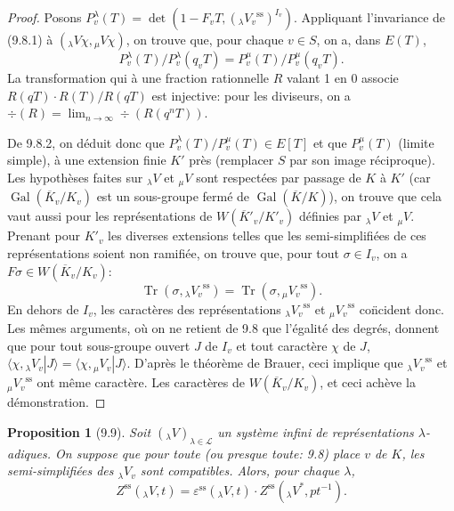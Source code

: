 \documentclass[11pt]{amsart}
\theoremstyle{plain}
\newtheorem{proposition}[theorem]{Proposition}
\theoremstyle{definition}
\DeclareMathOperator{\Gal}{Gal}
\DeclareMathOperator{\Tr}{Tr}
\begin{document}
\begin{proof}
Posons $P_v^\lambda(T) = \det(1 - F_v T, ({_\lambda V_v}^{\mathrm{ss}})^{I_v})$. Appliquant l'invariance de (9.8.1) \`a $(_\lambda V \chi, {_\mu V} \chi)$, on trouve que, pour chaque $v \in S$, on a, dans $E(T)$,
\begin{equation}
P_v^\lambda(T) / P_v^\lambda(q_v T) = P_v^\mu(T) / P_v^\mu(q_v T).
\tag{9.8.2}
\end{equation}
La transformation qui \`a une fraction rationnelle $R$ valant 1 en 0 associe $R(qT) \cdot R(T)/R(qT)$ est injective: pour les diviseurs, on a $\div(R) = \lim_{n \to \infty} \div(R(q^n T))$.

De 9.8.2, on d\'eduit donc que $P_v^\lambda(T) / P_v^\mu(T) \in E[T]$ et que $P_v^\mu(T)$ (limite simple), \`a une extension finie $K'$ pr\`es (remplacer $S$ par son image r\'eciproque). Les hypoth\`eses faites sur $_\lambda V$ et $_\mu V$ sont respect\'ees par passage de $K$ \`a $K'$ (car $\Gal(\overline{K}_v/K_v)$ est un sous-groupe ferm\'e de $\Gal(\overline{K}/K)$), on trouve que cela vaut aussi pour les repr\'esentations de $W(\overline{K}'_v/K'_v)$ d\'efinies par $_\lambda V$ et $_\mu V$. Prenant pour $K'_v$ les diverses extensions telles que les semi-simplifi\'ees de ces repr\'esentations soient non ramifi\'ee, on trouve que, pour tout $\sigma \in I_v$, on a $F\sigma \in W(\overline{K}_v/K_v)$:
\[
\Tr(\sigma, {_\lambda V_v}^{\mathrm{ss}}) = \Tr(\sigma, {_\mu V_v}^{\mathrm{ss}}).
\]
En dehors de $I_v$, les caract\`eres des repr\'esentations ${_\lambda V_v}^{\mathrm{ss}}$ et ${_\mu V_v}^{\mathrm{ss}}$ co\"ncident donc. Les m\^emes arguments, o\`u on ne retient de 9.8 que l'\'egalit\'e des degr\'es, donnent que pour tout sous-groupe ouvert $J$ de $I_v$ et tout caract\`ere $\chi$ de $J$, $\langle \chi, {_\lambda V_v}|J \rangle = \langle \chi, {_\mu V_v}|J \rangle$. D'apr\`es le th\'eor\`eme de Brauer, ceci implique que ${_\lambda V_v}^{\mathrm{ss}}$ et ${_\mu V_v}^{\mathrm{ss}}$ ont m\^eme caract\`ere. Les caract\`eres de $W(\overline{K}_v/K_v)$, et ceci ach\`eve la d\'emonstration.
\end{proof}

\begin{proposition}[9.9]
Soit $(_\lambda V)_{\lambda \in \mathcal{L}}$ un syst\`eme infini de repr\'esentations $\lambda$-adiques. On suppose que pour toute (ou presque toute: 9.8) place $v$ de $K$, les semi-simplifi\'ees des $_\lambda V_v$ sont compatibles. Alors, pour chaque $\lambda$,
\begin{equation}
Z^{\mathrm{ss}}(_\lambda V,t) = \varepsilon^{\mathrm{ss}}(_\lambda V,t) \cdot Z^{\mathrm{ss}}(_\lambda V^*, pt^{-1}).
\tag{9.9.0}
\end{equation}
\end{proposition}
\end{document}
